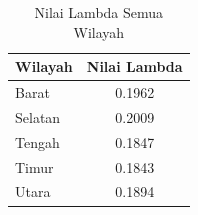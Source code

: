 \begin{table}[H]
    \centering
    \caption{Nilai Lambda Semua Wilayah}
    \label{table:nilai-lambda-semua-wilayah-starima}
    \begin{tabular}{l c}
        \toprule
        \textbf{Wilayah} & \textbf{Nilai Lambda} \\
        \midrule
        Barat   & 0.1962 \\
        Selatan & 0.2009 \\
        Tengah  & 0.1847 \\
        Timur   & 0.1843 \\
        Utara   & 0.1894 \\
        \bottomrule
    \end{tabular}
\end{table}